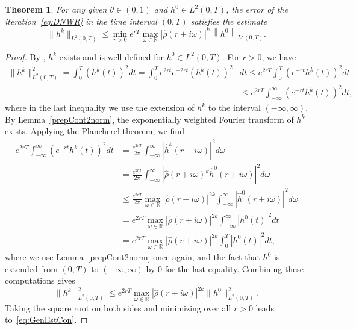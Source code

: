 \documentclass[reqno]{amsart}
\newtheorem{theorem}{Theorem}
\newcommand{\norm}[1]{\left\lVert#1\right\rVert}
\begin{document}
\begin{theorem}\label{2normSuperCont}
	For any given $\theta\in (0, 1)$ and $h^0\in L^2(0, T)$, the error of the iteration~\eqref{eq:DNWR} in the time interval $(0, T)$ satisfies the estimate 
	\begin{equation}\label{eq:GenEstCon}
	\|h^k\|_{L^2(0, T)} \leq \min_{r > 0} e^{rT}\max_{\omega \in \mathbb{R}} \left|\hat{\rho}(r + i \omega)\right|^k \, \norm{h^0}_{L^2(0, T)}.
	\end{equation}
\end{theorem} 

\begin{proof}
	By \cite[Chapter 4]{Lions72}, $h^k$ exists and is well defined for $h^0 \in L^2(0,T)$. For $r > 0$, we have
	\[\begin{aligned}
		\|h^k\|_{L^2(0, T)}^2 = \int_{0}^{T} \left(h^{k}(t)\right)^2 dt = \int_{0}^{T} e^{2rt} e^{-2 r t} \left(h^{k}(t)\right)^2 &dt \leq e^{2rT} \int_{0}^{T} \left(e^{-r t}h^{k}(t)\right)^2 dt \\
		&\leq e^{2rT} \int_{-\infty}^{\infty} \left( e^{- r t} h^{k}(t)\right)^2 dt,
	\end{aligned}\]
	where in the last inequality we use the  extension of $h^k$ to the interval $(-\infty,\infty)$. By Lemma~\ref{prepCont2norm}, the exponentially weighted Fourier transform of $h^k$ exists. Applying the Plancherel theorem, we find
	\[\begin{aligned}
		e^{2rT} \int_{-\infty}^{\infty} \left( e^{- r t}h^{k}(t)\right)^2 dt 
		&= \frac{e^{2rT}}{2 \pi} \int_{-\infty}^{\infty} \left| \hat{h}^{k}(r + i \omega) \right|^2 d\omega \\
		&= \frac{e^{2rT}}{2 \pi} \int_{-\infty}^{\infty} \left| \hat{\rho}(r + i \omega)^k \hat{h}^0(r + i \omega) \right|^2 d\omega \\
		&\leq \frac{e^{2rT}}{2 \pi} \max_{\omega \in \mathbb{R}} \left|\hat{\rho}(r  + i\omega)\right|^{2k} \int_{-\infty}^{\infty} \left| \hat{h}^{0}(r + i \omega) \right|^2 d\omega \\
		&= e^{2rT} \max_{\omega \in \mathbb{R}} \left|\hat{\rho}(r + i\omega)\right|^{2k}\int_{-\infty}^{\infty} \left| h^{0}(t) \right|^2 dt \\
		&= e^{2rT} \max_{\omega \in \mathbb{R}} \left|\hat{\rho}(r + i\omega)\right|^{2k}\int_{0}^{T} \left| h^{0}(t) \right|^2 dt,
	\end{aligned}\]
	where we use Lemma~\ref{prepCont2norm} once again, and the fact that $h^0$ is extended from $(0, T)$ to $(-\infty, \infty)$ by 0 for the last equality. Combining these computations gives 
	\[\|h^k\|_{L^2(0, T)}^2 \leq e^{2rT} \max_{\omega \in \mathbb{R}} |\hat{\rho}(r + i\omega)|^{2k} \|h^0\|_{L^2(0, T)}^2.\]
	Taking the square root on both sides and minimizing over all $r>0$ leads to~\eqref{eq:GenEstCon}.
\end{proof}
\end{document}
